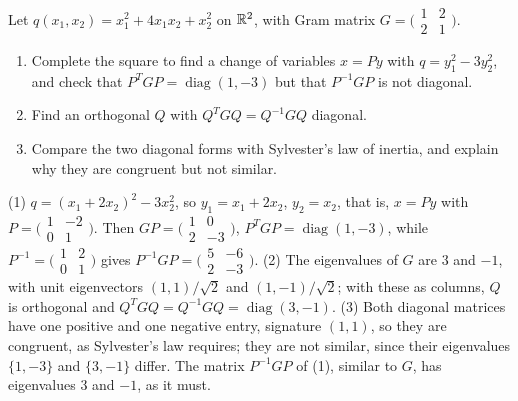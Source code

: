 \begin{exercise}\label{linear-algebra:exercise-change-of-variables}
Let $q(x_1, x_2) = x_1^2 + 4x_1x_2 + x_2^2$ on $\mathbb{R}^2$, with Gram matrix $G = \bigl(\begin{smallmatrix}1 & 2\\ 2 & 1\end{smallmatrix}\bigr)$.
\begin{enumerate}
\item Complete the square to find a change of variables $x = Py$ with $q = y_1^2 - 3y_2^2$, and check that $P^TGP = \operatorname{diag}(1, -3)$ but that $P^{-1}GP$ is not diagonal.
\item Find an orthogonal $Q$ with $Q^TGQ = Q^{-1}GQ$ diagonal.
\item Compare the two diagonal forms with Sylvester's law of inertia, and explain why they are congruent but not similar.
\end{enumerate}
\end{exercise}

\begin{solution}
(1) $q = (x_1 + 2x_2)^2 - 3x_2^2$, so $y_1 = x_1 + 2x_2$, $y_2 = x_2$, that is, $x = Py$ with $P = \bigl(\begin{smallmatrix}1 & -2\\ 0 & 1\end{smallmatrix}\bigr)$. Then
$GP = \bigl(\begin{smallmatrix}1 & 0\\ 2 & -3\end{smallmatrix}\bigr)$, $P^TGP = \operatorname{diag}(1, -3)$, while $P^{-1} = \bigl(\begin{smallmatrix}1 & 2\\ 0 & 1\end{smallmatrix}\bigr)$ gives
$P^{-1}GP = \bigl(\begin{smallmatrix}5 & -6\\ 2 & -3\end{smallmatrix}\bigr)$.
(2) The eigenvalues of $G$ are $3$ and $-1$, with unit eigenvectors $(1, 1)/\sqrt2$ and $(1, -1)/\sqrt2$; with these as columns, $Q$ is orthogonal and $Q^TGQ = Q^{-1}GQ = \operatorname{diag}(3, -1)$.
(3) Both diagonal matrices have one positive and one negative entry, signature $(1, 1)$, so they are congruent, as Sylvester's law requires; they are not similar, since their eigenvalues
$\{1, -3\}$ and $\{3, -1\}$ differ. The matrix $P^{-1}GP$ of (1), similar to $G$, has eigenvalues $3$ and $-1$, as it must.
\end{solution}

